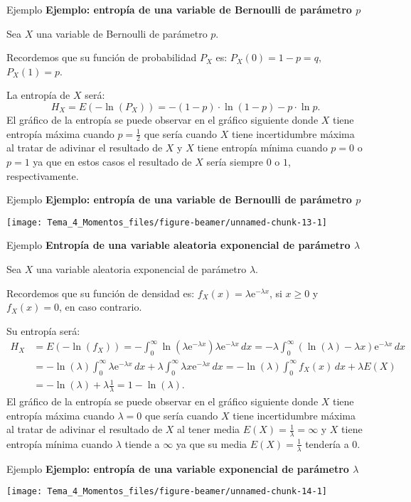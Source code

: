 \documentclass[
  ignorenonframetext,
  aspectratio=169]{beamer}
\begin{document}
\begin{frame}{Ejemplo}
\protect\hypertarget{ejemplo-12}{}
\textbf{Ejemplo: entropía de una variable de Bernoulli de parámetro
\(p\)}

Sea \(X\) una variable de Bernoulli de parámetro \(p\).

Recordemos que su función de probabilidad \(P_X\) es: \(P_X(0)=1-p=q,\)
\(P_X(1)=p\).

La entropía de \(X\) será: \[
H_X = E\left(-\ln(P_X)\right) = -(1-p)\cdot \ln(1-p)-p\cdot \ln p.
\] El gráfico de la entropía se puede observar en el gráfico siguiente
donde \(X\) tiene entropía máxima cuando \(p=\frac{1}{2}\) que sería
cuando \(X\) tiene incertidumbre máxima al tratar de adivinar el
resultado de \(X\) y \(X\) tiene entropía mínima cuando \(p=0\) o
\(p=1\) ya que en estos casos el resultado de \(X\) sería siempre \(0\)
o \(1\), respectivamente.
\end{frame}

\begin{frame}{Ejemplo}
\protect\hypertarget{ejemplo-13}{}
\textbf{Ejemplo: entropía de una variable de Bernoulli de parámetro
\(p\)}

\texttt{[image: Tema\_4\_Momentos\_files/figure-beamer/unnamed-chunk-13-1]}
\end{frame}

\begin{frame}{Ejemplo}
\protect\hypertarget{ejemplo-14}{}
\textbf{Entropía de una variable aleatoria exponencial de parámetro
\(\lambda\)}

Sea \(X\) una variable aleatoria exponencial de parámetro \(\lambda\).

Recordemos que su función de densidad es:
\(f_X(x)=\lambda \mathrm{e}^{-\lambda x}\), si \(x\geq 0\) y
\(f_X(x)=0\), en caso contrario.

Su entropía será: \[
\begin{array}{rl}
H_X & = E\left(-\ln(f_X)\right)=-\int_0^\infty \ln\left(\lambda\mathrm{e}^{-\lambda x}\right)\lambda\mathrm{e}^{-\lambda x}\, dx = -\lambda \int_0^\infty (\ln(\lambda) -\lambda x)\mathrm{e}^{-\lambda x}\, dx \\ & = -\ln (\lambda)\int_0^\infty \lambda\mathrm{e}^{-\lambda x}\, dx+\lambda \int_0^\infty \lambda x \mathrm{e}^{-\lambda x}\, dx =-\ln(\lambda)\int_0^\infty f_X(x)\, dx +\lambda E(X)\\ & =-\ln(\lambda)+\lambda \frac{1}{\lambda} =1-\ln(\lambda).
\end{array}
\] El gráfico de la entropía se puede observar en el gráfico siguiente
donde \(X\) tiene entropía máxima cuando \(\lambda=0\) que sería cuando
\(X\) tiene incertidumbre máxima al tratar de adivinar el resultado de
\(X\) al tener media \(E(X)=\frac{1}{\lambda}=\infty\) y \(X\) tiene
entropía mínima cuando \(\lambda\) tiende a \(\infty\) ya que su media
\(E(X)=\frac{1}{\lambda}\) tendería a 0.
\end{frame}

\begin{frame}{Ejemplo}
\protect\hypertarget{ejemplo-15}{}
\textbf{Ejemplo: entropía de una variable exponencial de parámetro
\(\lambda\)}

\texttt{[image: Tema\_4\_Momentos\_files/figure-beamer/unnamed-chunk-14-1]}
\end{frame}
\end{document}
